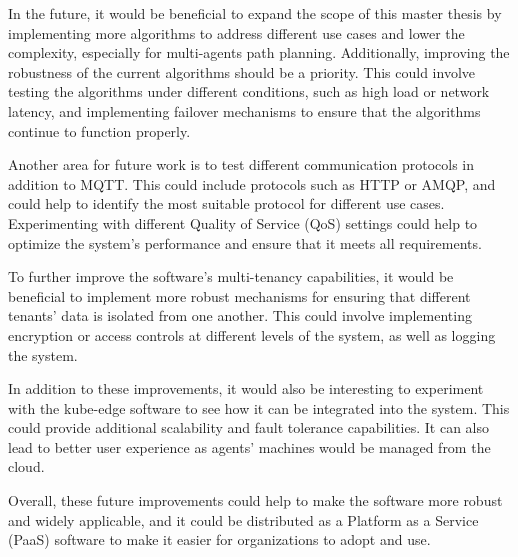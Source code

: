 In the future, it would be beneficial to expand the scope of this master thesis by implementing more algorithms to address different use cases and lower the complexity, especially for multi-agents path planning. Additionally, improving the robustness of the current algorithms should be a priority. This could involve testing the algorithms under different conditions, such as high load or network latency, and implementing failover mechanisms to ensure that the algorithms continue to function properly.

Another area for future work is to test different communication protocols in addition to MQTT. This could include protocols such as HTTP or AMQP, and could help to identify the most suitable protocol for different use cases. Experimenting with different Quality of Service (QoS) settings could help to optimize the system's performance and ensure that it meets all requirements.

To further improve the software's multi-tenancy capabilities, it would be beneficial to implement more robust mechanisms for ensuring that different tenants' data is isolated from one another. This could involve implementing encryption or access controls at different levels of the system, as well as logging the system.

In addition to these improvements, it would also be interesting to experiment with the kube-edge software to see how it can be integrated into the system. This could provide additional scalability and fault tolerance capabilities. It can also lead to better user experience as agents' machines would be managed from the cloud.


Overall, these future improvements could help to make the software more robust and widely applicable, and it could be distributed as a Platform as a Service (PaaS) software to make it easier for organizations to adopt and use.